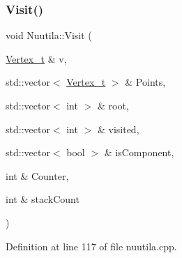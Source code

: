 \subsubsection{\texorpdfstring{Visit()}{Visit()}}
{\footnotesize\ttfamily void Nuutila\+::\+Visit (\begin{DoxyParamCaption}\item[{\hyperlink{class_graph_component_ae67114a6ce5a001dc35e1996e1b45aa0}{Vertex\+\_\+t} \&}]{v,  }\item[{std\+::vector$<$ \hyperlink{class_graph_component_ae67114a6ce5a001dc35e1996e1b45aa0}{Vertex\+\_\+t} $>$ \&}]{Points,  }\item[{std\+::vector$<$ int $>$ \&}]{root,  }\item[{std\+::vector$<$ int $>$ \&}]{visited,  }\item[{std\+::vector$<$ bool $>$ \&}]{is\+Component,  }\item[{int \&}]{Counter,  }\item[{int \&}]{stack\+Count }\end{DoxyParamCaption})}



Definition at line 117 of file nuutila.\+cpp.


